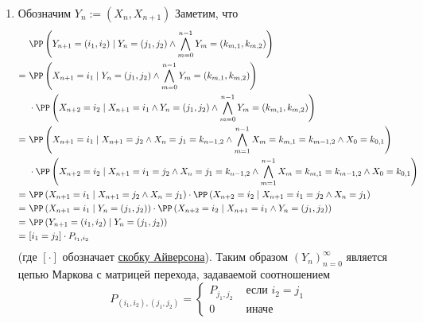 \documentclass[12pt,a4paper]{article}
\begin{document}
\begin{enumproblem}
\begin{enumerate}
            \item Обозначим $Y_n := (X_n, X_{n+1})$ Заметим, что
                \begin{align*}
                    &\PP\left(Y_{n+1} = (i_1, i_2) \mid Y_n = (j_1, j_2) \wedge \bigwedge_{m=0}^{n-1} Y_m = (k_{m, 1}, k_{m, 2})\right)\\
                    =\ &\PP\left(X_{n+1} = i_1 \mid Y_n = (j_1, j_2) \wedge \bigwedge_{m=0}^{n-1} Y_m = (k_{m, 1}, k_{m, 2})\right)\\
                    &\cdot \PP\left(X_{n+2} = i_2 \mid X_{n+1} = i_1 \wedge Y_n = (j_1, j_2) \wedge \bigwedge_{m=0}^{n-1} Y_m = (k_{m, 1}, k_{m, 2})\right)\\
                    =\ &\PP\left(X_{n+1} = i_1 \mid X_{n+1} = j_2 \wedge X_n = j_1 = k_{n-1, 2} \wedge \bigwedge_{m=1}^{n-1} X_m = k_{m, 1} = k_{m-1, 2} \wedge X_0 = k_{0, 1}\right)\\
                    &\cdot \PP\left(X_{n+2} = i_2 \mid X_{n+1} = i_1 = j_2 \wedge X_n = j_1 = k_{n-1, 2} \wedge \bigwedge_{m=1}^{n-1} X_m = k_{m, 1} = k_{m-1, 2} \wedge X_0 = k_{0, 1}\right)\\
                    =\ &\PP\left(X_{n+1} = i_1 \mid X_{n+1} = j_2 \wedge X_n = j_1\right) \cdot \PP\left(X_{n+2} = i_2 \mid X_{n+1} = i_1 = j_2 \wedge X_n = j_1\right)\\
                    =\ &\PP\left(X_{n+1} = i_1 \mid Y_n = (j_1, j_2)\right) \cdot \PP\left(X_{n+2} = i_2 \mid X_{n+1} = i_1 \wedge Y_n = (j_1, j_2)\right)\\
                    =\ &\PP\left(Y_{n+1} = (i_1, i_2) \mid Y_n = (j_1, j_2)\right)\\
                    =\ &[i_1 = j_2] \cdot P_{i_1, i_2}
                \end{align*}
                (где $[\cdot]$ обозначает \href{https://ru.wikipedia.org/wiki/\%D0\%A1\%D0\%BA\%D0\%BE\%D0\%B1\%D0\%BA\%D0\%B0_\%D0\%90\%D0\%B9\%D0\%B2\%D0\%B5\%D1\%80\%D1\%81\%D0\%BE\%D0\%BD\%D0\%B0}{скобку Айверсона}). Таким образом $(Y_n)_{n=0}^\infty$ является цепью Маркова с матрицей перехода, задаваемой соотношением
                \[
                    P_{(i_1, i_2), (j_1, j_2)} =
                    \begin{cases}
                        P_{j_1, j_2}& \text{ если } i_2 = j_1\\
                        0& \text{ иначе}
                    \end{cases}
                \]
        \end{enumerate}
    \end{enumproblem}
\end{document}
